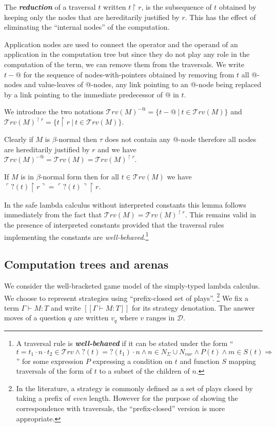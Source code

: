 \documentclass{llncs}
\newcommand\defname[1]{{\bf\em #1}\index{#1}}
\newcommand\travset{\mathcal{T}rv}
\newcommand\union{\cup}
\newcommand{\sem}[1]{{[\![ #1 ]\!]}}
\newcommand\imp{\Longrightarrow}
\newcommand\zand{\wedge}
\newcommand{\pview}[1]{\ulcorner #1 \urcorner}
\begin{document}
The \defname{reduction} of a traversal $t$ written $ t \upharpoonright
r$, is the subsequence of $t$ obtained by keeping only the nodes that
are hereditarily justified by $r$. This has the effect of eliminating
the ``internal nodes'' of the computation.

Application nodes are used to connect the operator and the operand of
an application in the computation tree but since they do not play any
role in the computation of the term, we can remove them from the
traversals.  We write $t-@$ for the sequence of nodes-with-pointers
obtained by removing from $t$ all @-nodes and value-leaves of @-nodes,
any link pointing to an @-node being replaced by a link pointing to
the immediate predecessor of @ in $t$.

We introduce the two notations $\travset(M)^{-@} = \{ t - @ \ | \  t \in \travset(M) \}$ and $\travset(M)^{\upharpoonright r} = \{ t  \upharpoonright r \ | \  t  \in \travset(M) \}$.
\begin{remark}
Clearly if $M$ is $\beta$-normal then $\tau$ does not contain any @-node therefore all nodes are
hereditarily justified by $r$ and we have $\travset(M)^{-@} = \travset(M) = \travset(M)^{\upharpoonright r }$.
\end{remark}

\begin{lemma}
\label{lem:redtrav_trav}
If $M$ is in $\beta$-normal form then for all $t\in \travset(M)$ we have $ \pview{?(t) \upharpoonright  r } = \pview{?(t)} \upharpoonright r$.
\end{lemma}
In the safe lambda calculus without interpreted constants this
lemma follows immediately from the fact that $\travset(M) =
\travset(M)^{\upharpoonright r }$. This remains valid in the presence of interpreted constants provided that the traversal rules
implementing the constants are \emph{well-behaved}.\footnote{A
traversal rule is \defname{well-behaved} if it can be stated under the
form ``$t = t_1\cdot n \cdot t_2 \in \travset \zand ?(t) = ?(t_1)
\cdot n \zand n \in N_{\Sigma}\union N_{var} \zand P(t) \zand m\in
S(t) \imp\ $\Pstr{ t_1\cdot (n){n} \cdot t_2 \cdot (m-n,25){m} \in \travset}'' for some expression $P$
expressing a condition on $t$ and function $S$ mapping traversals of the form of $t$ to a subset of the children of $n$.}

\subsection{Computation trees and arenas}
We consider the well-bracketed game model of the simply-typed
lambda calculus.  We choose to represent strategies using
``prefix-closed set of plays''.
\footnote{In the literature, a strategy is commonly defined as a set of plays
closed by taking a prefix of \emph{even} length. However for the purpose of showing the correspondence with traversals, the ``prefix-closed'' version is more appropriate.}
We fix a term $\Gamma \vdash M : T$ and write $\sem{\Gamma \vdash M : T}$ for its strategy denotation.
The answer moves of a question $q$ are written $v_q$ where $v$ ranges in $\mathcal{D}$.
\end{document}

